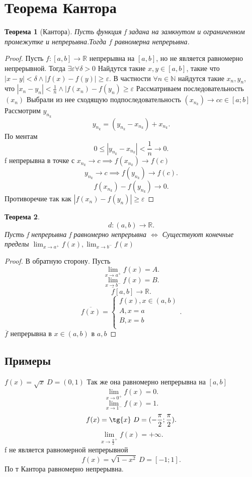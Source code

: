 \documentclass{scrartcl}
\newtheorem{theorem}{Теорема}
\begin{document}
\section{Теорема Кантора}
\begin{theorem}[Кантора]
    Пусть функция f задана на замкнутом и ограниченном промежутке и непрерывна.Тогда $f$ равномерна непрерывна.
\end{theorem}
\begin{proof}
    Пусть $f:[a,b] \to \mathbb{R}$ непрерывна на $[a,b]$, но не является равномерно непрерывной.
    Тогда $\exists  \varepsilon \forall  \delta >0$
    Найдутся такие $x,y \in[a,b]$, такие что  $|x - y| < \delta \land |f(x) - f(y)| \ge \varepsilon$.
    В частности $\forall  n \in \mathbb{N}$ найдутся такие $x_{n},y_{n}$,
    что $|x_{n} - y_{n}| < \frac{1}{n} \land |f(x_{n}) - f(y_{n}) \ge  \varepsilon$
    Рассматриваем последовательность $(x_{n})$ Выбрали из нее сходящую подпоследовательность $(x_{n_{k}}) \to c c \in [a;b]$
    Рассмотрим $y_{n_{k}}$ 
    \[
    y_{n_{k}} = (y_{n_{k}} - x_{n_{k}}) + x_{n_{k}}
    .\] 
    По ментам
    \[
    0 \le  |y_{n_{k}} - x_{n_{k}}| <\frac{1}{n} \to 0
    .\] 
    f непрерывна в точке с $x_{n_{k}} \to c \implies f(x_{n_{k}}) \to f(c)$ 
    \[
    y_{n_{k}} \to c \implies  f(y_{n_{k}}) \to f(c)
    .\] 
    \[
    f(x_{n_{k}}) - f(y_{n_{k}}) \to 0
    .\] 
    Противоречие так как $|f(x_{n})  - f(y_{n})| \ge  \varepsilon$
\end{proof}
\begin{theorem}
    \[
    d : (a,b) \to \mathbb{R}
    .\] 
    Пусть f непрерывна  f равномерно непрерывна $\iff$
    Существуют конечные пределы   $\lim_{x \to a^{+}} f(x) ,
    \lim_{x \to b^{-}}f(x) $
\end{theorem}
\begin{proof}
    В обратную сторону. Пусть 
    \[
    \lim_{x \to a^{+}}  f(x) = A
    .\] 
    \[
    \lim_{x \to b^{-}}  f(x) = B
    .\] 
    \[
        \overline{f} [a,b] \to \mathbb{R}
    .\] 
    \[
    \overline{f(x)} =
    \begin{cases}
        f(x), x \in (a,b)\\
        A , x = a\\
        B, x = b\\
    \end{cases}
    .\] 
    $\overline{f}$ непрерывна в $x \in (a,b)$ в  $a,b$
\end{proof}
\subsection{Примеры}
$f(x) = \sqrt{x} ~ D = (0,1) $ Так же она равномерно непрерывна на $[a,b]$
 \[
     \lim_{x \to 0^{+}} f(x) = 0
 .\] 
 \[
 \lim_{x \to 1^{-}} f(x) = 1
 .\] 
 \[
     f(x) = \tg{x} ~ D = (-\frac{\pi}{2}; \frac{\pi}{2})
 .\] 
 \[
 \lim_{x \to \frac{\pi}{2}^{+} }f(x)  = +\infty
 .\] 
 f не является равномерной непрерывной\\
 \[
     f(x) = \sqrt{1 - x^2}  ~D = [-1;1]
 .\] 
 По т Кантора равномерно непрерывна.
\section{}
\end{document}
